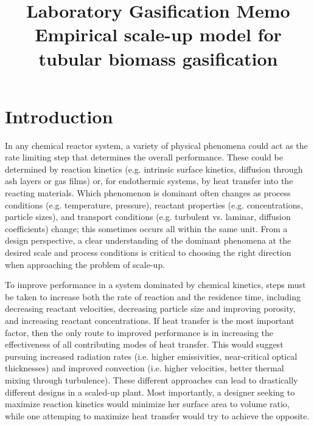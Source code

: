 \documentclass[11pt,twocolumn]{article}
\date{}
\title{Laboratory Gasification Memo\\Empirical scale-up model for tubular biomass gasification \vspace{-6ex}}
\begin{document}
\twocolumn[
  \begin{@twocolumnfalse}
    \maketitle
    \begin{abstract}
    


    \end{abstract}
  \end{@twocolumnfalse}
]

\section*{Introduction}

In any chemical reactor system, a variety of physical phenomena could act as the rate limiting step that determines the overall performance.  These could be determined by reaction kinetics (e.g. intrinsic surface kinetics, diffusion through ash layers or gas films) or, for endothermic systems, by heat transfer into the reacting materials.  Which phenomenon is dominant often changes as process conditions (e.g. temperature, pressure), reactant properties (e.g. concentrations, particle sizes), and transport conditions (e.g. turbulent vs. laminar, diffusion coefficients) change; this sometimes occurs all within the same unit.  From a design perspective, a clear understanding of the dominant phenomena at the desired scale and process conditions is critical to choosing the right direction when approaching the problem of scale-up. 

To improve performance in a system dominated by chemical kinetics, steps must be taken to increase both the rate of reaction and the residence time, including decreasing reactant velocities, decreasing particle size and improving porosity, and increasing reactant concentrations.  If heat transfer is the most important factor, then the only route to improved performance is in increasing the effectiveness of all contributing modes of heat transfer.  This would suggest pursuing increased radiation rates (i.e. higher emissivities, near-critical optical thicknesses) and improved convection (i.e. higher velocities, better thermal mixing through turbulence).  These different approaches can lead to drastically different designs in a scaled-up plant.  Most importantly, a designer seeking to maximize reaction kinetics would minimize her surface area to volume ratio, while one attemping to maximize heat transfer would try to achieve the opposite.
\end{document}
